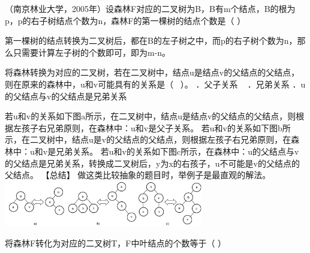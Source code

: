 \question （南京林业大学，2005年）设森林F对应的二叉树为B，B有m个结点，B的根为p，p的右子树结点个数为n，森林F的第一棵树的结点个数是（
）
\par{}
\begin{solution}第一棵树的结点转换为二叉树后，都在B的左子树之中，而p的右子树个数为n，那么只需要计算左子树的个数即可，即为m-n。
\end{solution}
\question 将森林转换为对应的二叉树，若在二叉树中，结点u是结点v的父结点的父结点，则在原来的森林中，u和v可能具有的关系是（
~）。 ．父子关系 ~ ．兄弟关系 ．u的父结点与v的父结点是兄弟关系
\par{}
\begin{solution}若u和v的关系如下图a所示，在二叉树中，结点u是结点v的父结点的父结点，则根据左孩子右兄弟原则，在森林中：u和v是父子关系。
若u和v的关系如下图b所示，在二叉树中，结点u是v的父结点的父结点，则根据左孩子右兄弟原则，在森林中：u和v是兄弟关系。
若u和v的关系如下图c所示，在森林中：u的父结点与v的父结点是兄弟关系，转换成二叉树后，y为x的右孩子，u不可能是v的父结点的父结点。
【总结】 做这类比较抽象的题目时，举例子是最直观的解法。
\includegraphics[width=3.43750in,height=0.79167in]{computerassets/c988dc89d58b0e157aa15f8cdbc93ba0.jpeg}
\end{solution}
\question 将森林F转化为对应的二叉树T，F中叶结点的个数等于（ ）
\par{}
